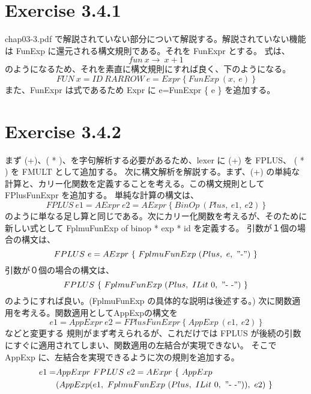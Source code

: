 \documentclass{jreport}
\begin{document}
		\section{Exercise 3.4.1}
			chap03-3.pdf で解説されていない部分について解説する。解説されていない機能は FunExp に還元される構文規則である。それを FunExpr とする。
式は、\begin{equation}fun \ x \rightarrow \ x+1 \end{equation} のようになるため、それを素直に構文規則にすれば良く、下のようになる。	
\begin{equation}FUN \ x=ID \ RARROW \ e=Expr \ \{ \ FunExp \ (x, \ e) \ \} \end{equation}
			また、FunExpr は式であるため Expr に e=FunExpr \{ e \} を追加する。
		\section{Exercise 3.4.2}
			まず (+)、( * )、を字句解析する必要があるため、lexer に (+) を FPLUS、 ( * ) を FMULT として追加する。
			次に構文解析を解説する。まず、(+) の単純な計算と、カリー化関数を定義することを考える。この構文規則として FPlusFunExpr を追加する。
			単純な計算の構文は、	
\begin{equation}FPLUS \ e1=AExpr \ e2=AExpr \ \{ \ BinOp \ (Plus, \ e1, \ e2) \ \} \end{equation}
			のように単なる足し算と同じである。次にカリー化関数を考えるが、そのために新しい式として FplmuFunExp of binop * exp * id を定義する。
			引数が１個の場合の構文は、
\begin{equation} FPLUS \ e=AExpr \ \{ \ FplmuFunExp \ (Plus, \ e, \ "\mathchar`-") \ \} \end{equation}
			引数が０個の場合の構文は、
\begin{equation}FPLUS \ \{ \ FplmuFunExp \ (Plus, \ ILit \ 0, \ "\mathchar`- \ \mathchar`-") \ \} \end{equation}			
			のようにすれば良い。(FplmuFunExp の具体的な説明は後述する。)
次に関数適用を考える。関数適用としてAppExpの構文を \begin{equation}e1=AppExpr \ e2=FPlusFunExpr \ \{ \ AppExp \ (e1, \ e2) \ \} \end{equation}などと変更する
			規則がまず考えられるが、これだけでは FPLUS が後続の引数にすぐに適用されてしまい、関数適用の左結合が実現できない。
			そこで AppExp に、左結合を実現できるように次の規則を追加する。	
\begin{equation}
	\begin{split}
		e1=&AppExpr \ FPLUS \ e2=AExpr \ \{ \  AppExp\\ &(AppExp(e1, \ FplmuFunExp \ (Plus, \ ILit \ 0, \ "\mathchar`- \ \mathchar`-")), \ e2) \ \} 
	\end{split}
\end{equation}
\end{document}
